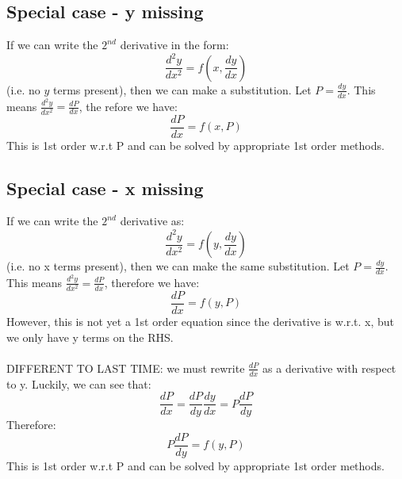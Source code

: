 \documentclass{scrartcl}
\begin{document}
\subsection{Special case - y missing}
If we can write the $ 2^{nd} $ derivative in the form:
\begin{equation}
\frac{d^{2}y}{dx^{2}} = f(x, \frac{dy}{dx})
\end{equation}
(i.e. no $ y $ terms present), then we can make a substitution. Let $ P = \frac{dy}{dx} $. This means $ \frac{d^{2}y}{dx^{2}} = \frac{dP}{dx} $, the
refore we have:
\begin{equation}
\frac{dP}{dx} = f(x, P)
\end{equation}
This is 1st order w.r.t P and can be solved by appropriate 1st order methods.

\subsection{Special case - x missing}
If we can write the $ 2^{nd} $ derivative as:
\begin{equation}
\frac{d^{2}y}{dx^{2}} = f(y, \frac{dy}{dx})
\end{equation}
(i.e. no x terms present), then we can make the same substitution. Let $ P = \frac{dy}{dx} $. This means $ \frac{d^{2}y}{dx^{2}} = \frac{dP}{dx} $, therefore we have:
\begin{equation}
\frac{dP}{dx} = f(y, P)
\end{equation}
However, this is not yet a 1st order equation since the derivative is w.r.t. x, but we only have y terms on the RHS.
\\\\
DIFFERENT TO LAST TIME: we must rewrite $ \frac{dP}{dx} $ as a derivative with respect to y. Luckily, we can see that:
\begin{equation}
\frac{dP}{dx} = \frac{dP}{dy}\frac{dy}{dx} = P\frac{dP}{dy}
\end{equation}
Therefore:
\begin{equation}
P\frac{dP}{dy} = f(y, P)
\end{equation}
This is 1st order w.r.t P and can be solved by appropriate 1st order methods.
\end{document}
